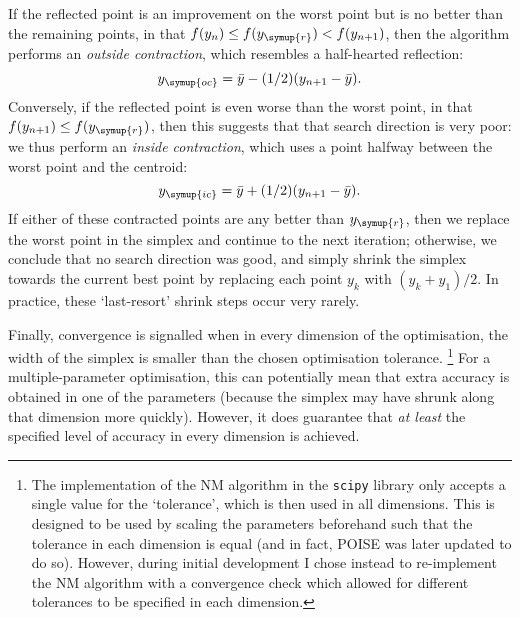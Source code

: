 If the reflected point is an improvement on the worst point but is no better than the remaining points, in that $f(y_n) \leq f(y_{\symup{r}}) < f(y_{n+1})$, then the algorithm performs an \textit{outside contraction}, which resembles a half-hearted reflection:
\begin{equation}
    \label{eq:nm_outside_contract}
    y_{\symup{oc}} = \bar{y} - (1/2)(y_{n+1} - \bar{y}).
\end{equation}
Conversely, if the reflected point is even worse than the worst point, in that $f(y_{n+1}) \leq f(y_{\symup{r}})$, then this suggests that that search direction is very poor: we thus perform an \textit{inside contraction}, which uses a point halfway between the worst point and the centroid:
\begin{equation}
    \label{eq:nm_inside_contract}
    y_{\symup{ic}} = \bar{y} + (1/2)(y_{n+1} - \bar{y}).
\end{equation}
If either of these contracted points are any better than $y_{\symup{r}}$, then we replace the worst point in the simplex and continue to the next iteration; otherwise, we conclude that no search direction was good, and simply shrink the simplex towards the current best point by replacing each point $y_k$ with $(y_k + y_1)/2$.
In practice, these `last-resort' shrink steps occur very rarely.

Finally, convergence is signalled when in every dimension of the optimisation, the width of the simplex is smaller than the chosen optimisation tolerance.%
\footnote{The implementation of the NM algorithm in the \texttt{scipy} library only accepts a single value for the `tolerance', which is then used in all dimensions.
This is designed to be used by scaling the parameters beforehand such that the tolerance in each dimension is equal (and in fact, POISE was later updated to do so).
However, during initial development I chose instead to re-implement the NM algorithm with a convergence check which allowed for different tolerances to be specified in each dimension.}
For a multiple-parameter optimisation, this can potentially mean that extra accuracy is obtained in one of the parameters (because the simplex may have shrunk along that dimension more quickly).
However, it does guarantee that \textit{at least} the specified level of accuracy in every dimension is achieved.
